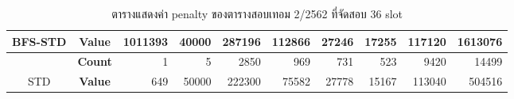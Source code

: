 \begin{table}[]
{\begin{tabular}{@{}ccrrrrrrrr@{}}
    \multirow{-2}{*}{BFS-STD}                    & \textbf{Value}                        & 1011393                        & 40000                          & 287196                         & 112866                         & 27246                          & 17255                          & 117120                         & 1613076                          \\ \midrule
                                                  & {\textbf{Count}} & {1}       & {5}       & {2850}    & {969}     & {731}     & {523}     & {9420}    & {14499}     \\ \cmidrule(l){2-10} 
    \multirow{-2}{*}{STD} & {\textbf{Value}} & {649}     & {50000}   & {222300}  & {75582}   & {27778}   & {15167}   & {113040}  & {504516}    \\ \bottomrule
    \end{tabular}%
    }
    \caption{ตารางแสดงค่า penalty ของตารางสอบเทอม 2/2562 ที่จัดสอบ 36 slot}
    \label{tab:result_table_262_36}
\end{table}

